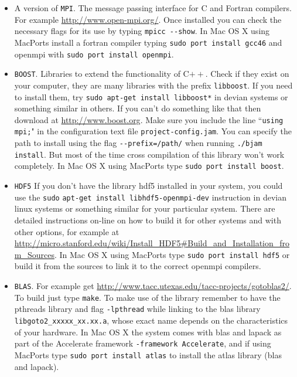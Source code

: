 \begin{itemize}
\item A version of \verb!MPI!.
The message passing interface for C and Fortran compilers. For example \url{http://www.open-mpi.org/}. 
Once installed you can check the necessary flags for its use by typing 
\verb!mpicc --show!. 
In Mac OS X using MacPorts install a fortran compiler typing 
\verb!sudo port install gcc46! and openmpi with \verb!sudo port install openmpi!.
  
\item \verb!BOOST!.
Libraries to extend the functionality of C$++$. Check if they exist on your computer, they are many 
libraries with the prefix \verb!libboost!. 
If you need to install them, try \verb!sudo apt-get install libboost*! in devian systems or 
something similar in others. 
If you can't do something like that then download at \url{http://www.boost.org}. 
Make sure you include the line ``\verb!using mpi;!" in the configuration text file \verb!project-config.jam!.
You can specify the path to install using the flag \verb!--prefix=/path/! when running \verb!./bjam! 
\verb!install!. But most of the time cross compilation of this library won't work completely. 
In Mac OS X using MacPorts type \verb!sudo port install boost!.

\item \verb!HDF5!
If you don't have the library hdf5 installed in your system, you could use the 
\verb!sudo! \verb!apt-get install libhdf5-openmpi-dev! instruction in devian linux systems or something similar 
for your particular system. There are detailed instructions on-line on how to build it for other systems and 
with other options, for example at \url{http://micro.stanford.edu/wiki/Install_HDF5#Build_and_Installation_from_Sources}.
In Mac OS X using MacPorts type \verb!sudo port install hdf5! or build it from the sources to link it to the correct 
openmpi compilers.

\item \verb!BLAS!.
For example get \url{http://www.tacc.utexas.edu/tacc-projects/gotoblas2/}. To build just type \verb!make!. 
To make use of the library remember to 
have the pthreads library and flag  \verb!-lpthread! while linking to the blas library  \verb!libgoto2_xxxxx_xx.xx.a!,
whose exact name depends on the characteristics of your hardware. In Mac OS X 
the system comes with blas and lapack as part of the Accelerate framework \verb!-framework Accelerate!, 
and if using MacPorts type 
\verb!sudo port install atlas! to install the atlas library (blas and lapack).


\end{itemize}

